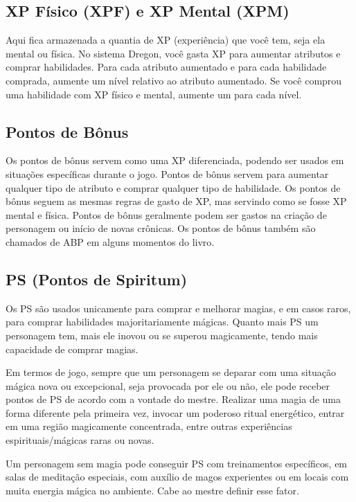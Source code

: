 \subsection{XP Físico (XPF) e XP Mental (XPM)}    

Aqui fica armazenada a quantia de XP (experiência) que você tem, seja ela mental ou física. No sistema Dregon, você gasta XP para aumentar atributos e comprar habilidades. Para cada atributo aumentado e para cada habilidade comprada, aumente um nível relativo ao atributo aumentado. Se você comprou uma habilidade com XP físico e mental, aumente um para cada nível.

\subsection{Pontos de Bônus}

Os pontos de bônus servem como uma XP diferenciada, podendo ser usados em situações específicas durante o jogo. Pontos de bônus servem para aumentar qualquer tipo de atributo e comprar qualquer tipo de habilidade. Os pontos de bônus seguem as mesmas regras de gasto de XP, mas servindo como se fosse XP mental e física. Pontos de bônus geralmente podem ser gastos na criação de personagem ou início de novas crônicas. Os pontos de bônus também são chamados de ABP em alguns momentos do livro.


\subsection{PS (Pontos de Spiritum)}

	Os PS são usados unicamente para comprar e melhorar magias, e em casos raros, para comprar habilidades majoritariamente mágicas. Quanto mais PS um personagem tem, mais ele inovou ou se superou magicamente, tendo mais capacidade de comprar magias.
	

	Em termos de jogo, sempre que um personagem se deparar com uma situação mágica nova ou excepcional, seja provocada por ele ou não, ele pode receber pontos de PS de acordo com a vontade do mestre. Realizar uma magia de uma forma diferente pela primeira vez, invocar um poderoso ritual energético, entrar em uma região magicamente concentrada, entre outras experiências espirituais/mágicas raras ou novas. 
	

Um personagem sem magia pode conseguir PS com treinamentos específicos, em salas de meditação especiais, com auxílio de magos experientes ou em locais com muita energia mágica no ambiente. Cabe ao mestre definir esse fator.

